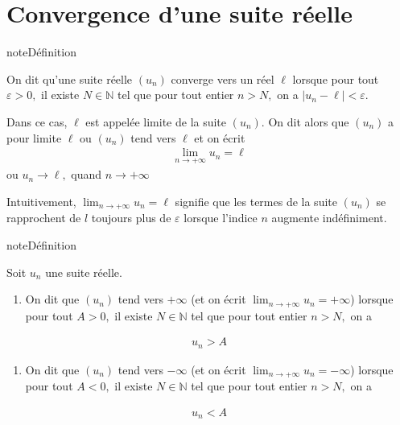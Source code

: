 \documentclass[letterpaper,10pt,french]{jupyterBook}
\begin{document}
\section{Convergence d’une suite réelle}
\label{\detokenize{suites:convergence-d-une-suite-reelle}}
\begin{sphinxadmonition}{note}{Définition}

\sphinxAtStartPar
On dit qu’une suite réelle \((u_n)\) converge vers un réel \(\ell\) lorsque pour tout \(\varepsilon>0,\) il existe \(N\in \mathbb{N}\) tel que pour tout entier \(n>N,\) on a \(|u_n-\ell|<\varepsilon.\)

\sphinxAtStartPar
Dans ce cas, \(\ell\) est appelée limite de la suite \((u_n).\) On dit alors que \((u_n)\) a pour limite \(\ell\) ou \((u_n)\) tend vers \(\ell\) et on écrit
\begin{equation*}
\begin{split}
\lim_{n \rightarrow +\infty}u_n = \ell
\end{split}
\end{equation*}
\sphinxAtStartPar
ou \(u_n\rightarrow \ell,\) quand \(n\rightarrow+\infty\)
\end{sphinxadmonition}

\sphinxAtStartPar
Intuitivement, \(\lim_{n \rightarrow +\infty}u_n = \ell\) signifie que les termes de la suite \((u_n)\) se rapprochent de \(l\) toujours plus de \(\varepsilon\) lorsque l’indice \(n\) augmente indéfiniment.

\begin{sphinxadmonition}{note}{Définition}

\sphinxAtStartPar
Soit \(u_n\) une suite réelle.
\begin{enumerate}
%
\item {} 
\sphinxAtStartPar
On dit que \((u_n)\) tend vers \(+\infty\) (et on écrit \(\lim_{n \rightarrow +\infty}u_n =+\infty\)) lorsque pour tout \(A>0,\) il existe \(N\in \mathbb{N}\) tel que pour tout entier \(n>N,\) on a

\end{enumerate}
\begin{equation*}
\begin{split}
u_n>A
\end{split}
\end{equation*}\begin{enumerate}
%
\item {} 
\sphinxAtStartPar
On dit que \((u_n)\) tend vers \(-\infty\) (et on écrit \(\lim_{n \rightarrow +\infty}u_n =-\infty\)) lorsque pour tout \(A<0,\) il existe \(N\in \mathbb{N}\) tel que pour tout entier \(n>N,\) on a

\end{enumerate}
\begin{equation*}
\begin{split}
u_n<A
\end{split}
\end{equation*}\end{sphinxadmonition}
\end{document}
